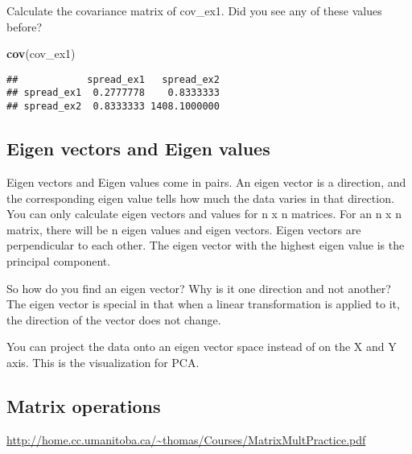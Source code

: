\documentclass[11pt,]{article}
\newenvironment{Shaded}{\begin{snugshade}}{\end{snugshade}}
\newcommand{\KeywordTok}[1]{\textcolor[rgb]{0.13,0.29,0.53}{\textbf{#1}}}
\newcommand{\NormalTok}[1]{#1}
\begin{document}
Calculate the covariance matrix of cov\_ex1. Did you see any of these
values before?

\begin{Shaded}
\begin{Highlighting}[]
\KeywordTok{cov}\NormalTok{(cov_ex1)}
\end{Highlighting}
\end{Shaded}

\begin{verbatim}
##            spread_ex1   spread_ex2
## spread_ex1  0.2777778    0.8333333
## spread_ex2  0.8333333 1408.1000000
\end{verbatim}

\subsection{Eigen vectors and Eigen
values}\label{eigen-vectors-and-eigen-values}

Eigen vectors and Eigen values come in pairs. An eigen vector is a
direction, and the corresponding eigen value tells how much the data
varies in that direction. You can only calculate eigen vectors and
values for n x n matrices. For an n x n matrix, there will be n eigen
values and eigen vectors. Eigen vectors are perpendicular to each other.
The eigen vector with the highest eigen value is the principal
component.

So how do you find an eigen vector? Why is it one direction and not
another? The eigen vector is special in that when a linear
transformation is applied to it, the direction of the vector does not
change.

You can project the data onto an eigen vector space instead of on the X
and Y axis. This is the visualization for PCA.

\subsection{Matrix operations}\label{matrix-operations}

\url{http://home.cc.umanitoba.ca/~thomas/Courses/MatrixMultPractice.pdf}
\end{document}
